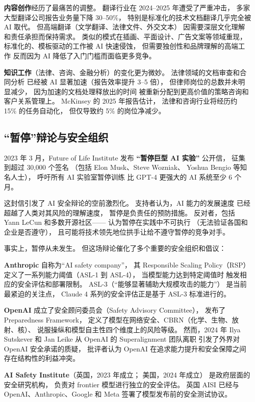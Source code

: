 \textbf{内容创作}经历了最痛苦的调整。
翻译行业在 2024--2025 年遭受了严重冲击，
多家大型翻译公司报告业务量下降 30--50\%，
特别是标准化的技术文档翻译几乎完全被 AI 取代。
但高端翻译（文学翻译、法律文件、外交文本）
因需要深层文化理解和责任承担而保持需求。
类似的模式在插画、平面设计、广告文案等领域重现，
标准化的、模板驱动的工作被 AI 快速侵蚀，
但需要独创性和品牌理解的高端工作
反而因为 AI 降低了入门门槛而面临更多竞争。

\textbf{知识工作}（法律、咨询、金融分析）的变化更为微妙。
法律领域的文档审查和合同分析
已经被 AI 显著加速（报告效率提升 3--5 倍），
但律师岗位的总数并未明显减少，
因为加速的文档处理释放出的时间
被重新分配到更高价值的策略咨询和客户关系管理上。
McKinsey 的 2025 年报告估计，
法律和咨询行业将经历约 15\% 的任务自动化，
但仅导致约 5\% 的岗位净减少。

\subsection{“暂停”辩论与安全组织}

2023 年 3 月，Future of Life Institute 发布
\textbf{“暂停巨型 AI 实验”} 公开信，
征集到超过 30,000 个签名
（包括 Elon Musk、Steve Wozniak、
Yoshua Bengio 等知名人士），
呼吁所有 AI 实验室暂停训练
比 GPT-4 更强大的 AI 系统至少 6 个月。

这封信引发了 AI 安全辩论的空前激烈化。
支持者认为，AI 能力的发展速度
已经超越了人类对其风险的理解速度，
暂停是负责任的预防措施。
反对者，包括 Yann LeCun 和多数开源社区——
认为暂停在实践中不可执行
（无法验证各国和企业是否遵守），
且可能将技术领先地位拱手让给不遵守暂停的竞争对手。

事实上，暂停从未发生。
但这场辩论催化了多个重要的安全组织和倡议：

\textbf{Anthropic} 自称为“AI safety company”，
其 Responsible Scaling Policy（RSP）
定义了一系列能力阈值（ASL-1 到 ASL-4），
当模型能力达到特定阈值时
触发相应的安全评估和部署限制。
ASL-3（“能够显著辅助大规模攻击的能力”）
是当前最紧迫的关注点，
Claude 4 系列的安全评估正是基于 ASL-3 标准进行的。

\textbf{OpenAI} 成立了安全顾问委员会（Safety Advisory Committee），
发布了 Preparedness Framework，
定义了模型在网络安全、CBRN（化学、生物、放射、核）、
说服操纵和模型自主性四个维度上的风险等级。
然而，2024 年 Ilya Sutskever 和 Jan Leike
从 OpenAI 的 Superalignment 团队离职
引发了外界对 OpenAI 安全承诺的质疑，
批评者认为 OpenAI 在追求能力提升和安全保障之间
存在结构性的利益冲突。

\textbf{AI Safety Institute}（英国，2023 年成立；
美国，2024 年成立）
是政府层面的安全研究机构，
负责对 frontier 模型进行独立的安全评估。
英国 AISI 已经与 OpenAI、Anthropic、Google 和 Meta
签署了模型发布前的安全测试协议。

